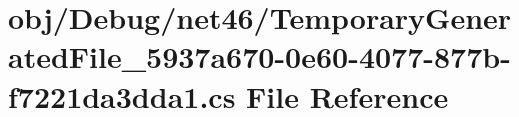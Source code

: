 \hypertarget{net46_2_temporary_generated_file__5937a670-0e60-4077-877b-f7221da3dda1_8cs}{}\section{obj/\+Debug/net46/\+Temporary\+Generated\+File\+\_\+5937a670-\/0e60-\/4077-\/877b-\/f7221da3dda1.cs File Reference}
\label{net46_2_temporary_generated_file__5937a670-0e60-4077-877b-f7221da3dda1_8cs}
